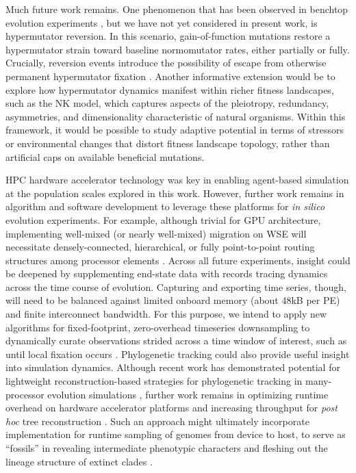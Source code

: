 Much future work remains.
One phenomenon that has been observed in benchtop evolution experiments \citep{ho2021evolutionary}, but we have not yet considered in present work, is hypermutator reversion.
In this scenario, gain-of-function mutations restore a hypermutator strain toward baseline normomutator rates, either partially or fully.
Crucially, reversion events introduce the possibility of escape from otherwise permanent hypermutator fixation \citep{taddei1997role}.
Another informative extension would be to explore how hypermutator dynamics manifest within richer fitness landscapes, such as the NK model, which captures aspects of the pleiotropy, redundancy, asymmetries, and dimensionality characteristic of natural organisms.
Within this framework, it would be possible to study adaptive potential in terms of stressors or environmental changes that distort fitness landscape topology, rather than artificial caps on available beneficial mutations.

HPC hardware accelerator technology was key in enabling agent-based simulation at the population scales explored in this work.
However, further work remains in algorithm and software development to leverage these platforms for \textit{in silico} evolution experiments.
For example, although trivial for GPU architecture, implementing well-mixed (or nearly well-mixed) migration on WSE will necessitate densely-connected, hierarchical, or fully point-to-point routing structures among processor elements \citep{james2020physical,luczynski2024near}.
Across all future experiments, insight could be deepened by supplementing end-state data with records tracing dynamics across the time course of evolution.
Capturing and exporting time series, though, will need to be balanced against limited onboard memory (about 48kB per PE) and finite interconnect bandwidth.
For this purpose, we intend to apply new algorithms for fixed-footprint, zero-overhead timeseries downsampling to dynamically curate observations strided across a time window of interest, such as until local fixation occurs \citep{moreno2024structured}.
Phylogenetic tracking could also provide useful insight into simulation dynamics.
Although recent work has demonstrated potential for lightweight reconstruction-based strategies for phylogenetic tracking in many-processor evolution simulations \citep{moreno2022hereditary}, further work remains in optimizing runtime overhead on hardware accelerator platforms and increasing throughput for \textit{post hoc} tree reconstruction \citep{moreno2024trackable,moreno2024analysis}.
Such an approach might ultimately incorporate implementation for runtime sampling of genomes from device to host, to serve as ``fossils'' in revealing intermediate phenotypic characters and fleshing out the lineage structure of extinct clades \citep{moreno2024guide}.

